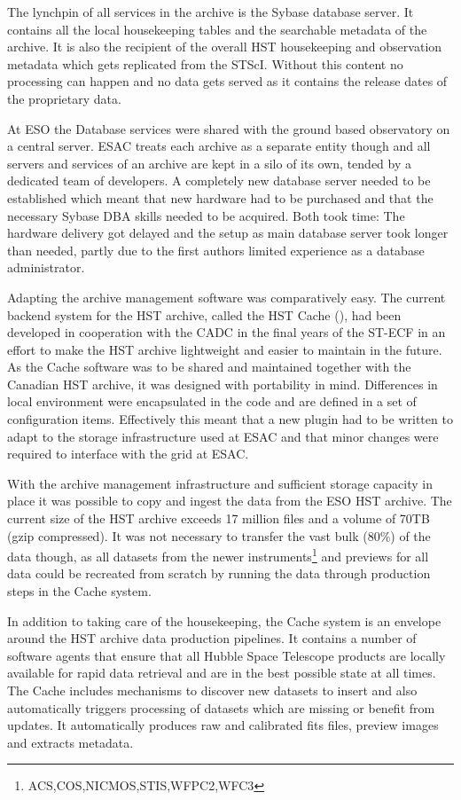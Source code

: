 The lynchpin of all services in the archive is the Sybase database server. It contains all the local housekeeping tables and the searchable metadata of the archive. 
It is also the recipient of the overall HST housekeeping  and observation metadata which gets replicated from the STScI. Without this content no processing can happen and no data gets served as it contains the release dates of the proprietary data.
  
At ESO the Database services were shared with the ground based observatory on a central server. ESAC treats each archive as a separate entity though and all servers and services of an archive are kept in a silo of its own, tended by a dedicated team of developers.
A completely new database server needed to be established which meant that new hardware had to be purchased and that the necessary Sybase DBA skills needed to be acquired. Both took time: The hardware delivery got delayed and the setup as main database server took longer than needed, partly due to the first authors limited experience as a database administrator.

Adapting the archive management software was comparatively easy. The current backend system for the HST archive, called the HST Cache (\cite{2010ASPC..434..275H}),  had been developed in cooperation with the CADC in the final years of the ST-ECF in an effort to make the HST archive lightweight and easier to maintain in the future. As the Cache software was to be shared and maintained together with the Canadian HST archive, it was designed with portability in mind. Differences in local environment were encapsulated in the code and are defined in a set of configuration items. Effectively this meant that a new plugin had to be written to adapt to the storage infrastructure used at ESAC and that minor changes were required to interface with the grid at ESAC. 


With the archive management infrastructure and sufficient storage capacity in place it was possible to copy and ingest the data from the ESO HST archive.
The current size of the HST archive exceeds 17 million files and a volume of 70TB (gzip compressed). 
It was not necessary to transfer the vast bulk (80\%) of the data though, as all datasets from the newer instruments\footnote{ACS,COS,NICMOS,STIS,WFPC2,WFC3} and previews for all data could be recreated from scratch by running the data through production steps in the Cache system. 

In addition to taking care of the housekeeping, the Cache system is an envelope around the HST archive data production pipelines. It contains a number of software agents that ensure that all Hubble Space Telescope products are locally available for rapid data retrieval and are in the best possible state at all times.  
The Cache includes mechanisms to discover new datasets to insert and also automatically triggers processing of datasets which are missing or benefit from updates.
It automatically produces raw and calibrated fits files, preview images and extracts metadata.

